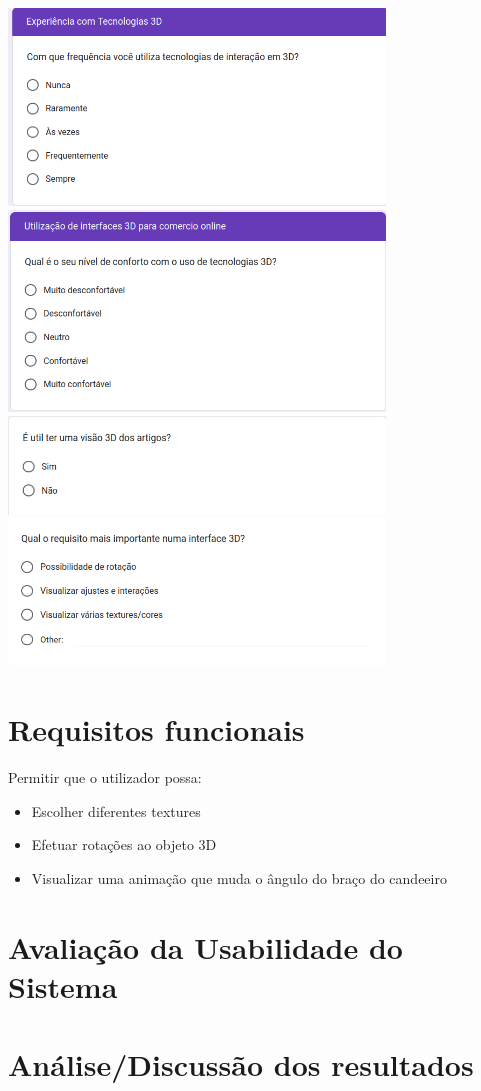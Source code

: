 \documentclass[a4paper,12pt]{article}
\begin{document}
\begin{center}
    \includegraphics[width=0.75\textwidth]{form/17questao_frequencia3d.png}
    \includegraphics[width=0.75\textwidth]{form/18questao_conforto3d.png}
    \includegraphics[width=0.75\textwidth]{form/19questao_visao3d.png}
    \includegraphics[width=0.75\textwidth]{form/20questao_requisito3d.png}
\end{center}

\newpage
\section{Requisitos funcionais}
    Permitir que o utilizador possa:
    \begin{itemize}
        \item Escolher diferentes textures
        \item Efetuar rotações ao objeto 3D
        \item Visualizar uma animação que muda o ângulo do braço do candeeiro
    \end{itemize}

\newpage
\section{Avaliação da Usabilidade do Sistema}

\newpage
\section{Análise/Discussão dos resultados}
\end{document}
